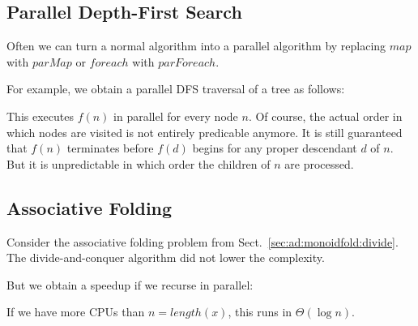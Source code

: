 \subsection{Parallel Depth-First Search}

Often we can turn a normal algorithm into a parallel algorithm by replacing $map$ with $parMap$ or $foreach$ with $parForeach$.

For example, we obtain a parallel DFS traversal of a tree as follows:
\begin{acode}
\end{acode}

This executes $f(n)$ in parallel for every node $n$.
Of course, the actual order in which nodes are visited is not entirely predicable anymore.
It is still guaranteed that $f(n)$ terminates before $f(d)$ begins for any proper descendant $d$ of $n$.
But it is unpredictable in which order the children of $n$ are processed.


\subsection{Associative Folding}\label{sec:ad:monoidfold:parallel}

Consider the associative folding problem from Sect.~\ref{sec:ad:monoidfold:divide}.
The divide-and-conquer algorithm did not lower the complexity.

But we obtain a speedup if we recurse in parallel:

\begin{acode}
\end{acode}

If we have more CPUs than $n=length(x)$, this runs in $\Theta(\log n)$.

